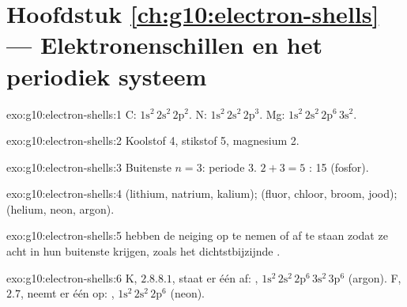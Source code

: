 \section*{Hoofdstuk \ref{ch:g10:electron-shells} --- Elektronenschillen en het periodiek systeem}

\begin{solution}{exo:g10:electron-shells:1}
C: $1\mathrm{s}^2\,2\mathrm{s}^2\,2\mathrm{p}^2$. N:
$1\mathrm{s}^2\,2\mathrm{s}^2\,2\mathrm{p}^3$. Mg:
$1\mathrm{s}^2\,2\mathrm{s}^2\,2\mathrm{p}^6\,3\mathrm{s}^2$.
\end{solution}

\begin{solution}{exo:g10:electron-shells:2}
Koolstof 4, stikstof 5, magnesium 2.
\end{solution}

\begin{solution}{exo:g10:electron-shells:3}
Buitenste  $n = 3$: periode 3. $2 + 3 = 5$ :
 15 (fosfor).
\end{solution}

\begin{solution}{exo:g10:electron-shells:4}
 (lithium, natrium, kalium);  (fluor, chloor,
broom, jood);  (helium, neon, argon).
\end{solution}

\begin{solution}{exo:g10:electron-shells:5}
 hebben de neiging  op te nemen of af te staan zodat ze
acht  in hun buitenste  krijgen, zoals het
dichtstbijzijnde .
\end{solution}

\begin{solution}{exo:g10:electron-shells:6}
K, $2.8.8.1$, staat er één af: ,
$1\mathrm{s}^2\,2\mathrm{s}^2\,2\mathrm{p}^6\,3\mathrm{s}^2\,3\mathrm{p}^6$
(argon). F, $2.7$, neemt er één op: ,
$1\mathrm{s}^2\,2\mathrm{s}^2\,2\mathrm{p}^6$ (neon).
\end{solution}

